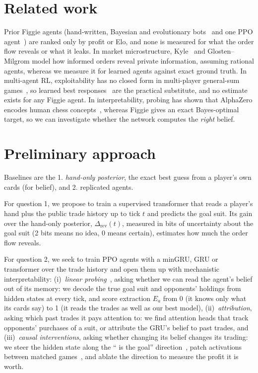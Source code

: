 \documentclass{article}
\newcommand{\Club}{\ding{168}}
\begin{document}
\section{Related work}
Prior Figgie agents (hand-written, Bayesian and evolutionary bots~\cite{figment,figgiebot} and one PPO agent~\cite{cs224r}) are ranked only by profit or Elo, and none is measured for what the order flow reveals or what it leaks.
In market microstructure, Kyle~\cite{kyle} and Glosten--Milgrom model how informed orders reveal private information, assuming rational agents, whereas we measure it for learned agents against exact ground truth.
In multi-agent RL, exploitability has no closed form in multi-player general-sum games~\cite{pluribus}, so learned best responses~\cite{timbers} are the practical substitute, and no estimate exists for any Figgie agent.
In interpretability, probing has shown that AlphaZero encodes human chess concepts~\cite{alphazero_probe}, whereas Figgie gives an exact Bayes-optimal target, so we can investigate whether the network computes the \emph{right} belief.

\section{Preliminary approach}
Baselines are the 1. \emph{hand-only posterior}, the exact best guess from a player's own cards (for belief), and 2. replicated agents.

For question 1, we propose to train a supervised transformer that reads a player's hand plus the public trade history up to tick $t$ and predicts the goal suit. Its gain over the hand-only posterior, $\Delta_{\text{rev}}(t)$, measured in bits of uncertainty about the goal suit (2 bits means no idea, 0 means certain), estimates how much the order flow reveals.

For question 2, we seek to train PPO agents with a minGRU, GRU or transformer over the trade history and open them up with mechanistic interpretability:
(i)~\emph{linear probing}~\cite{probes}, asking whether we can read the agent's belief out of its memory: we decode the true goal suit and opponents' holdings from hidden states at every tick, and score extraction $E_a$ from 0 (it knows only what its cards say) to 1 (it reads the trades as well as our best model),
(ii)~\emph{attribution}, asking which past trades it pays attention to: we find attention heads that track opponents' purchases of a suit, or attribute the GRU's belief to past trades, and
(iii)~\emph{causal interventions}, asking whether changing its belief changes its trading: we steer the hidden state along the ``\Club{} is the goal'' direction~\cite{actadd}, patch activations between matched games~\cite{rome}, and ablate the direction to measure the profit it is worth.
\end{document}

